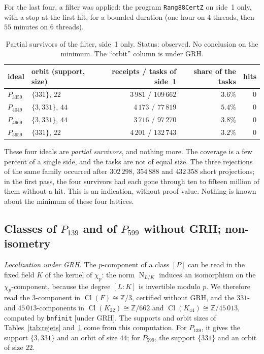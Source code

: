 \documentclass[11pt,a4paper]{amsart}
\theoremstyle{plain}
\theoremstyle{definition}
\numberwithin{equation}{section}
\newcommand{\Z}{\mathbb{Z}}
\DeclareMathOperator{\Nm}{N}
\DeclareMathOperator{\Cl}{Cl}
\newcommand{\st}[1]{\textup{\textsf{\small[#1]}}}
\newcommand{\GRH}{\st{under GRH}}
\begin{document}
For the last four, a filter was applied: the program \texttt{Rang88CertZ} on side~1 only, with a stop at the first hit, for a bounded duration (one hour on $4$ threads, then $55$ minutes on $6$ threads).

\begin{table}[ht]
\caption{Partial survivors of the filter, side~1 only. Status: observed. No conclusion on the minimum. The ``orbit'' column is under GRH.}\label{tab:survivants}
\centering\small
\begin{tabular}{llrrr}
\toprule
ideal & orbit (support, size) & receipts / tasks of side~1 & share of the tasks & hits \\
\midrule
$P_{3359}$ & $\{331\}$, $22$ & $3\,981$ / $109\,662$ & $3.6\%$ & $0$ \\
$P_{4049}$ & $\{3,331\}$, $44$ & $4\,173$ / $77\,819$ & $5.4\%$ & $0$ \\
$P_{4969}$ & $\{3,331\}$, $44$ & $3\,716$ / $97\,270$ & $3.8\%$ & $0$ \\
$P_{5659}$ & $\{331\}$, $22$ & $4\,201$ / $132\,743$ & $3.2\%$ & $0$ \\
\bottomrule
\end{tabular}
\end{table}

These four ideals are \emph{partial survivors}, and nothing more. The coverage is a few percent of a single side, and the tasks are not of equal size. The three rejections of the same family occurred after $302\,298$, $354\,888$ and $432\,358$ short projections; in the first pass, the four survivors had each gone through ten to fifteen million of them without a hit. This is an indication, without proof value. Nothing is known about the minimum of these four lattices.

\subsection{Classes of \texorpdfstring{$P_{139}$}{P139} and of \texorpdfstring{$P_{599}$}{P599} without GRH; non-isometry}\label{subsec:classes}

\emph{Localization under GRH.} The $p$-component of a class $[P]$ can be read in the fixed field $K$ of the kernel of $\chi_p$: the norm $\Nm_{L/K}$ induces an isomorphism on the $\chi_p$-component, because the degree $[L:K]$ is invertible modulo $p$. We therefore read the $3$-component in $\Cl(F)\cong\Z/3$, certified without GRH, and the $331$- and $45\,013$-components in $\Cl(K_{22})\cong\Z/662$ and $\Cl(K_{44})\cong\Z/45\,013$, computed by \texttt{bnfinit} \GRH. The supports and orbit sizes of Tables~\ref{tab:rejets} and~\ref{tab:survivants} come from this computation. For $P_{139}$, it gives the support $\{3,331\}$ and an orbit of size $44$; for $P_{599}$, the support $\{331\}$ and an orbit of size $22$.
\end{document}
